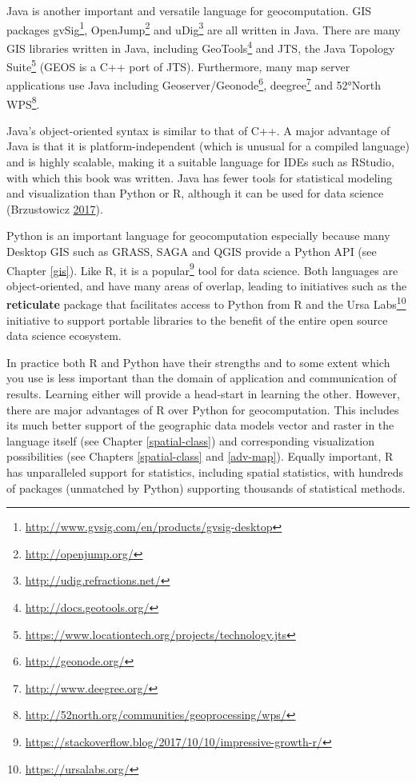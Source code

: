 \documentclass[]{krantz}
\let\rmarkdownfootnote\footnote%
\def\footnote{\protect\rmarkdownfootnote}
\renewcommand{\href}[2]{#2\footnote{\url{#1}}}
\begin{document}
Java is another important and versatile language for geocomputation.
GIS packages \href{http://www.gvsig.com/en/products/gvsig-desktop}{gvSig}, \href{http://openjump.org/}{OpenJump} and \href{http://udig.refractions.net/}{uDig} are all written in Java.
There are many GIS libraries written in Java, including \href{http://docs.geotools.org/}{GeoTools} and JTS, the \href{https://www.locationtech.org/projects/technology.jts}{Java Topology Suite} (GEOS is a C++ port of JTS).
Furthermore, many map server applications use Java including \href{http://geonode.org/}{Geoserver/Geonode}, \href{http://www.deegree.org/}{deegree} and \href{http://52north.org/communities/geoprocessing/wps/}{52°North WPS}.

Java's object-oriented syntax is similar to that of C++.
A major advantage of Java is that it is platform-independent (which is unusual for a compiled language) and is highly scalable, making it a suitable language for IDEs such as RStudio, with which this book was written.
Java has fewer tools for statistical modeling and visualization than Python or R, although it can be used for data science (Brzustowicz \protect\hyperlink{ref-brzustowicz_data_2017}{2017}).

Python is an important language for geocomputation especially because many Desktop GIS such as GRASS, SAGA and QGIS provide a Python API (see Chapter \ref{gis}).
Like R, it is a \href{https://stackoverflow.blog/2017/10/10/impressive-growth-r/}{popular} tool for data science.
Both languages are object-oriented, and have many areas of overlap, leading to initiatives such as the \textbf{reticulate} package that facilitates access to Python from R and the \href{https://ursalabs.org/}{Ursa Labs} initiative to support portable libraries to the benefit of the entire open source data science ecosystem.

In practice both R and Python have their strengths and to some extent which you use is less important than the domain of application and communication of results.
Learning either will provide a head-start in learning the other.
However, there are major advantages of R over Python for geocomputation.
This includes its much better support of the geographic data models vector and raster in the language itself (see Chapter \ref{spatial-class}) and corresponding visualization possibilities (see Chapters \ref{spatial-class} and \ref{adv-map}).
Equally important, R has unparalleled support for statistics, including spatial statistics, with hundreds of packages (unmatched by Python) supporting thousands of statistical methods.
\end{document}
